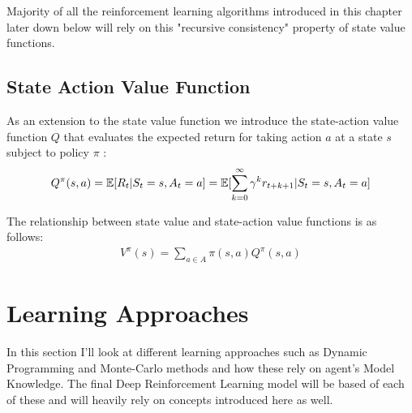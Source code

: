 Majority of all the reinforcement learning algorithms introduced in this chapter later down below will rely on this "recursive consistency" \cite{lecture_mdp} property of state value functions. 


\subsection{State Action Value Function}
As an extension to the state value function we introduce the state-action value function $Q$ that evaluates the expected return for taking action $a$ at a state $s$ subject to policy $\pi$ \cite{lecture_mdp} :
\begin{align}
    Q^{\pi}(s, a) = \operatorname{\mathbb{E}}[R_t | S_t = s, A_t = a] = \operatorname{\mathbb{E}}[\sum^{\infty}_{k=0} \gamma^k r_{t+k+1} | S_t = s, A_t = a]
\end{align}

The relationship between state value and state-action value functions is as follows:
\begin{align}
    V^{\pi}(s) = \sum_{a \in A} \pi(s, a) Q^{\pi}(s, a) 
\end{align}


\section{Learning Approaches}

In this section I'll look at different learning approaches such
as Dynamic Programming and Monte-Carlo methods and how 
these rely on agent's Model Knowledge. The final Deep Reinforcement Learning model will be based of each of these 
and will heavily rely on concepts introduced here as well. 

